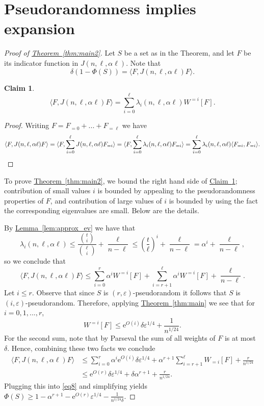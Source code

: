 \documentclass[11pt]{article}
\newcommand{\expref}[2]{\texorpdfstring{\hyperref[#2]{#1~\ref{#2}}}{#1~\ref{#2}}}
\newtheorem{claim}[theorem]{Claim}
\newcommand{\eee}{\mathrm e}
\newcommand\inner[2]{\langle{#1},{#2}\rangle}
\newcommand\eps{\varepsilon}
\renewcommand\geq{\geqslant}
\renewcommand\leq{\leqslant}
\newcommand\expp[1]{\eee^{O({#1})}}
\newcommand\lvlfn[2]{{#1}_{={#2}}}
\begin{document}
\section{Pseudorandomness implies expansion}\label{section:exp_pf}
\begin{proof}[Proof of \expref{Theorem}{thm:main2}]
Let $S$ be a set as in the Theorem, and let $F$ be its indicator function in $J(n,\ell,\alpha \ell)$.
Note that
\begin{equation}\label{eq8}
\delta(1 - \Phi(S)) = \inner{F}{J(n,\ell,\alpha\ell) F}.
\end{equation}
\begin{claim}\label{claim:express_expansion}
\[
\inner{F}{J(n,\ell,\alpha\ell) F} = \sum\limits_{i=0}^{\ell}{\lambda_i(n,\ell,\alpha\ell) W^{=i}[F]}.
\]
\end{claim}
\begin{proof}
Writing $F=\lvlfn{F}{0}+...+\lvlfn{F}{\ell}$ we have
\[
\inner{F}{J(n,\ell,\alpha\ell) F}
=
\inner{F}{\sum\limits_{i=0}^{\ell}{J(n,\ell,\alpha\ell) \lvlfn{F}{i}}}
=
\inner{F}{\sum\limits_{i=0}^{\ell}{\lambda_i(n,\ell,\alpha\ell) \lvlfn{F}{i}}}
=\sum\limits_{i=0}^{\ell}\lambda_i(n,\ell,\alpha\ell) \inner{\lvlfn{F}{i}}{\lvlfn{F}{i}}.%
\qedhere    %
\]
\end{proof}
To prove \expref{Theorem}{thm:main2}, we bound the right hand side of \expref{Claim}{claim:express_expansion}; contribution of small %
values $i$  %
is bounded
by appealing to the pseudorandomness properties of $F$, and contribution of large
%
values of $i$  %
is bounded by using the fact the corresponding eigenvalues
are small. Below are the details.

By \expref{Lemma}{lem:approx_ev} we have that
\[
\lambda_i(n,\ell,\alpha\ell)
\leq \frac{\binom{t}{i}}{\binom{\ell}{i}} + \frac{\ell}{n-\ell}
\leq \left(\frac{t}{\ell}\right)^i + \frac{\ell}{n-\ell}
=\alpha^{i} + \frac{\ell}{n-\ell},
\]
so we conclude that
\[
\inner{F}{J(n,\ell,\alpha\ell) F}
\leq \sum\limits_{i=0}^{r}{\alpha^i W^{=i}[F]}
     + \sum\limits_{i=r+1}^{\ell}{\alpha^i W^{=i}[F]}
     +\frac{\ell}{n-\ell}.
\]
Let $i\leq r$. Observe that since $S$ is $(r,\eps)$-pseudorandom it follows that $S$ is $(i,\eps)$-pseudorandom.
Therefore, applying \expref{Theorem}{thm:main} we see that for $i=0,1,...,r$,
\[
W^{=i}[F]\leq
\expp{i} \delta\eps^{1/4} + \frac{1}{n^{1/24}}.
\]
For the second sum, note that by Parseval the sum of all weights of $F$ is at most $\delta$. Hence, combining these two facts
we conclude
\begin{align*}
\inner{F}{J(n,\ell,\alpha\ell) F}
&\leq  \sum\limits_{i=0}^{r}{\alpha^i \expp{i} \delta\eps^{1/4}}
+\alpha^{r+1} \sum\limits_{i=r+1}^{\ell}{W_{=i}[F]}
+\frac{r}{n^{1/24}} \\
&\leq
\expp{r} \delta\eps^{1/4}
+\delta \alpha^{r+1}
+\frac{r}{n^{1/24}} .
\end{align*}
Plugging this into \eqref{eq8} and simplifying yields $\Phi(S) \geq 1 - \alpha^{r+1} - \expp{r} \eps^{1/4} - \frac{1}{n^{1/24}\delta}$.
%
\end{proof}
\end{document}
